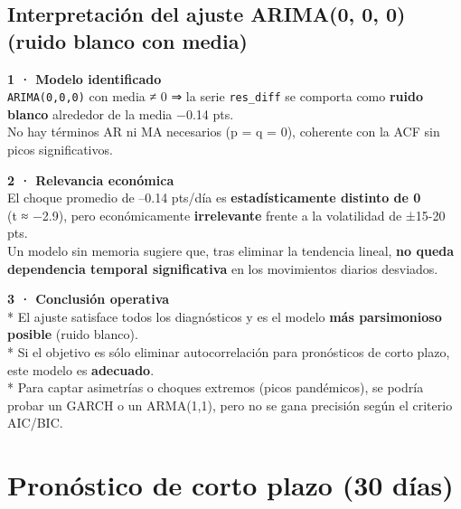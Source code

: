 \documentclass[
  11pt,
]{book}
\begin{document}
\subsection{Interpretación del ajuste ARIMA(0, 0, 0) (ruido blanco con media)}\label{interpretaciuxf3n-del-ajuste-arima0-0-0-ruido-blanco-con-media}

\textbf{1 · Modelo identificado}\\
\texttt{ARIMA(0,0,0)} con media ≠ 0 ⇒ la serie \texttt{res\_diff} se comporta como \textbf{ruido blanco} alrededor de la media −0.14 pts.\\
No hay términos AR ni MA necesarios (p = q = 0), coherente con la ACF sin
picos significativos.

\textbf{2 · Relevancia económica}\\
El choque promedio de --0.14 pts/día es \textbf{estadísticamente distinto de 0}\\
(t ≈ −2.9), pero económicamente \textbf{irrelevante} frente a la volatilidad de
±15-20 pts.\\
Un modelo sin memoria sugiere que, tras eliminar la tendencia lineal, \textbf{no
queda dependencia temporal significativa} en los movimientos diarios
desviados.

\textbf{3 · Conclusión operativa}\\
* El ajuste satisface todos los diagnósticos y es el modelo \textbf{más
parsimonioso posible} (ruido blanco).\\
* Si el objetivo es sólo eliminar autocorrelación para pronósticos de corto
plazo, este modelo es \textbf{adecuado}.\\
* Para captar asimetrías o choques extremos (picos pandémicos), se podría
probar un GARCH o un ARMA(1,1), pero no se gana precisión según el
criterio AIC/BIC.

\section{Pronóstico de corto plazo (30 días)}\label{pronuxf3stico-de-corto-plazo-30-duxedas}
\end{document}

